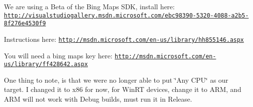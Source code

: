We are using a Beta of the Bing Maps S\+D\+K, install here\+: \href{http://visualstudiogallery.msdn.microsoft.com/ebc98390-5320-4088-a2b5-8f276e4530f9}{\tt http\+://visualstudiogallery.\+msdn.\+microsoft.\+com/ebc98390-\/5320-\/4088-\/a2b5-\/8f276e4530f9}

Instructions here\+: \href{http://msdn.microsoft.com/en-us/library/hh855146.aspx}{\tt http\+://msdn.\+microsoft.\+com/en-\/us/library/hh855146.\+aspx}

You will need a bing maps key here\+: \href{http://msdn.microsoft.com/en-us/library/ff428642.aspx}{\tt http\+://msdn.\+microsoft.\+com/en-\/us/library/ff428642.\+aspx}

One thing to note, is that we were no longer able to put \char`\"{}\+Any C\+P\+U\char`\"{} as our target. I changed it to x86 for now, for Win\+R\+T devices, change it to A\+R\+M, and A\+R\+M will not work with Debug builds, must run it in Release. 
